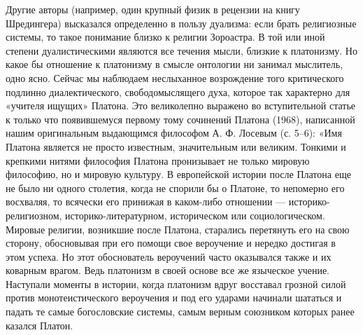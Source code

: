 Другие  авторы  (например, один  крупный  физик  в рецензии  на  книгу
Шредингера)  высказался  определенно  в пользу  дуализма:  если  брать
религиозные системы, то такое понимание  близко к религии Зороастра. В
той  или  иной степени  дуалистическими  являются  все течения  мысли,
близкие  к платонизму.  Но какое  бы отношение  к платонизму  в смысле
онтологии  ни  занимал  мыслитель,  одно  ясно.  Сейчас  мы  наблюдаем
неслыханное  возрождение того  критического подлинно  диалектического,
свободомыслящего  духа, которое  так характерно  для «учителя  ищущих»
Платона. Это великолепно выражено во вступительной статье к только что
появившемуся первому  тому сочинений Платона (1968),  написанной нашим
оригинальным  выдающимся  философом  А.  Ф. Лосевым  (с.  5--6):  «Имя
Платона  является  не  просто  известным,  значительным  или  великим.
Тонкими  и крепкими  нитями  философия Платона  пронизывает не  только
мировую философию, но и мировую  культуру. В европейской истории после
Платона  еще  не было  ни  одного  столетия,  когда  не спорили  бы  о
Платоне,  то  непомерно его  восхваляя,  то  всячески его  принижая  в
каком-либо отношении  --- историко-религиозном, историко-литературном,
историческом  или социологическом.  Мировые  религии, возникшие  после
Платона,  старались перетянуть  его на  свою сторону,  обосновывая при
его  помощи свое  вероучение  и  нередко достигая  в  этом успеха.  Но
этот  обоснователь вероучений  часто  оказывался также  и их  коварным
врагом.  Ведь  платонизм  в  своей основе  все  же  языческое  учение.
Наступали моменты  в истории, когда платонизм  вдруг восставал грозной
силой против  монотеистического вероучения и под  его ударами начинали
шататься  и  падать  те   самые  богословские  системы,  самым  верным
союзником которых ранее казался Платон.

